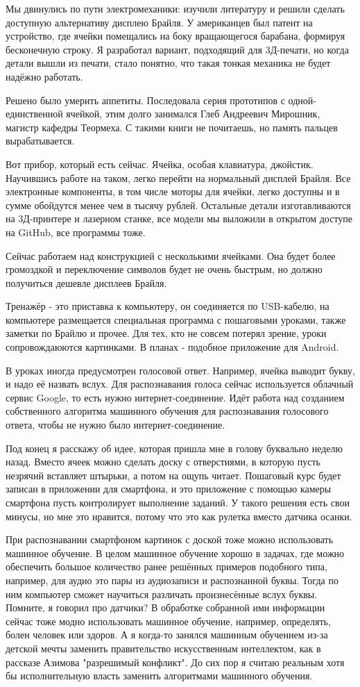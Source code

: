 \documentclass[a4paper,12pt]{article} %
\begin{document}
Мы двинулись по пути электромеханики: изучили литературу и решили сделать доступную альтернативу дисплею Брайля. У американцев был патент на устройство, где ячейки помещались на боку вращающегося барабана, формируя бесконечную строку. Я разработал вариант, подходящий для 3Д-печати, но когда детали вышли из печати, стало понятно, что такая тонкая механика не будет надёжно работать.

Решено было умерить аппетиты. Последовала серия прототипов с одной-единственной ячейкой, этим долго занимался Глеб Андреевич Мирошник, магистр кафедры Теормеха. С такими книги не почитаешь, но память пальцев вырабатывается.

Вот прибор, который есть сейчас. Ячейка, особая клавиатура, джойстик. Научившись работе на таком, легко перейти на нормальный дисплей Брайля. Все электронные компоненты, в том числе моторы для ячейки, легко доступны и в сумме обойдутся менее чем в тысячу рублей. Остальные детали изготавливаются на 3Д-принтере и лазерном станке, все модели мы выложили в открытом доступе на GitHub, все программы тоже. 

Сейчас работаем над конструкцией с несколькими ячейками. Она будет более громоздкой и переключение символов будет не очень быстрым, но должно получиться дешевле дисплеев Брайля.

Тренажёр - это приставка к компьютеру, он соединяется по USB-кабелю, на компьютере размещается специальная программа с пошаговыми уроками, также заметки по Брайлю и прочее. Для тех, кто не совсем потерял зрение, уроки сопровождаюются картинками. В планах - подобное приложение для Android.

В уроках иногда предусмотрен голосовой ответ. Например, ячейка выводит букву, и надо её назвать вслух. Для распознавания голоса сейчас используется облачный сервис Google, то есть нужно интернет-соединение. Идёт работа над созданием собственного алгоритма машинного обучения для распознавания голосового ответа, чтобы не нужно было интернет-соединение.

\hrulefill

Под конец я расскажу об идее, которая пришла мне в голову буквально неделю назад. Вместо ячеек можно сделать доску с отверстиями, в которую пусть незрячий вставляет штырьки, а потом на ощупь читает. Пошаговый курс будет записан в приложении для смартфона, и это приложение с помощью камеры смартфона пусть контролирует выполнение заданий. У такого решения есть свои минусы, но мне это нравится, потому что это как рулетка вместо датчика осанки.

При распознавании смартфоном картинок с доской тоже можно использовать машинное обучение. В целом машинное обучение хорошо в задачах, где можно обеспечить большое количество ранее решённых примеров подобного типа, например, для аудио это пары из аудиозаписи и распознанной буквы. Тогда по ним компьютер сможет научиться различать произнесённые вслух буквы. Помните, я говорил про датчики? В обработке собранной ими информации сейчас тоже модно использовать машинное обучение, например, определять, болен человек или здоров. А я когда-то занялся машинным обучением из-за детской мечты заменить правительство искусственным интеллектом, как в рассказе Азимова "разрешимый конфликт". До сих пор я считаю реальным хотя бы исполнительную власть заменить алгоритмами машинного обучения.   
\end{document}
